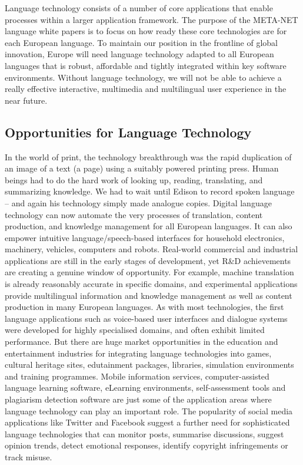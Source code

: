 \documentclass[]{../metanetpaper}
\begin{document}
Language technology consists of a number of core applications that enable processes within a larger application framework. The purpose of the META-NET language white papers is to focus on how ready these core technologies are for each European language.
To maintain our position in the frontline of global innovation, Europe will need language technology adapted to all European languages that is robust, affordable and tightly integrated within key software environments. Without language technology, we will not be able to achieve a really effective interactive, multimedia and multilingual user experience in the near future.
	
	\subsection{Opportunities for Language Technology}
In the world of print, the technology breakthrough was the rapid duplication of an image of a text (a page) using a suitably powered printing press. Human beings had to do the hard work of looking up, reading, translating, and summarizing knowledge. We had to wait until Edison to record spoken language – and again his technology simply made analogue copies. Digital language technology can now automate the very processes of translation, content production, and knowledge management for all European languages. It can also empower intuitive language/speech-based interfaces for household electronics, machinery, vehicles, computers and robots. Real-world commercial and industrial applications are still in the early stages of development, yet R\&D achievements are creating a genuine window of opportunity. For example, machine translation is already reasonably accurate in specific domains, and experimental applications provide multilingual information and knowledge management as well as content production in many European languages. As with most technologies, the first language applications such as voice-based user interfaces and dialogue systems were developed for highly specialised domains, and often exhibit limited performance. But there are huge market opportunities in the education and entertainment industries for integrating language technologies
into games, cultural heritage sites, edutainment packages, libraries, simulation environments and training programmes. Mobile information services, computer-assisted language learning software, eLearning environments, self-assessment tools and plagiarism detection software are just some of the application areas where language technology can play an important role. The popularity of social media applications like Twitter and Facebook suggest a further need for sophisticated language technologies that can monitor posts, summarise discussions, suggest opinion trends, detect emotional responses, identify copyright infringements or track misuse.
\end{document}
